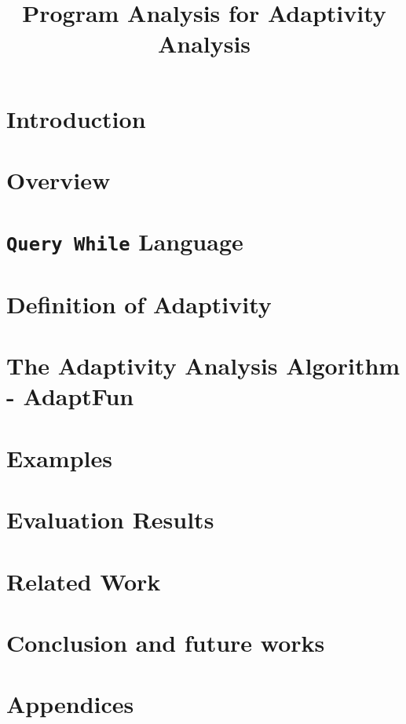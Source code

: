 \documentclass[a4paper,11pt]{article}
\newcommand{\THESYSTEM}{\textsf{AdaptFun}}
\begin{document}
\title{Program Analysis for Adaptivity Analysis}

\author{}

\date{}

\maketitle
%
\tableofcontents


\section{Introduction}
\label{sec:intro}

\section{Overview}
\label{sec:overview}

\clearpage

\section{{\tt Query While} Language}
\label{sec:language}

\clearpage
% 
% 
\section{Definition of Adaptivity}
\label{sec:adaptivity}

\clearpage
\section{The Adaptivity Analysis Algorithm - {\THESYSTEM}}
\label{sec:algorithm}


\section{Examples}
\label{sec:examples}


\section{Evaluation Results}



\section{Related Work}

\section{Conclusion and future works}


%
\clearpage
\appendix
{}
\section*{Appendices}



\end{document}
